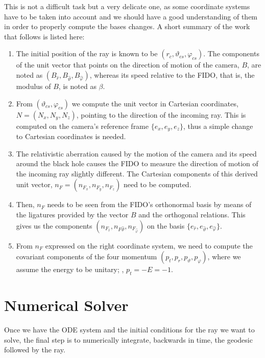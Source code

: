 This is not a difficult task but a very delicate one, as some coordinate systems have to be taken into account and we should have a good understanding of them in order to properly compute the bases changes. A short summary of the work that follows is listed here:
\begin{enumerate}
	\item The initial position of the ray is known to be $(r_c, \vartheta_{cs}, \varphi_{cs})$. The components of the unit vector that points on the direction of motion of the camera, $B$, are noted as $(B_{\widehat{r}}, B_{\widehat{\vartheta}}, B_{\widehat{\varphi}})$, whereas its speed relative to the \ac{FIDO}, that is, the modulus of $B$, is noted as $\beta$.
	\item From $(\vartheta_{cs}, \varphi_{cs})$ we compute the unit vector in Cartesian coordinates, $N = (N_x, N_y, N_z)$, pointing to the direction of the incoming ray. This is computed on the camera's reference frame $\{e_x, e_y, e_z\}$, thus a simple change to Cartesian coordinates is needed.
	\item The relativistic aberration caused by the motion of the camera and its speed around the black hole causes the \ac{FIDO} to measure the direction of motion of the incoming ray slightly different. The Cartesian components of this derived unit vector, $n_F = (n_{F_x}, n_{F_y}, n_{F_z})$ need to be computed.
	\item Then, $n_F$ needs to be seen from the \ac{FIDO}'s orthonormal basis by means of the ligatures provided by the vector $B$ and the orthogonal relations. This gives us the components $(n_{F_{\widehat{r}}}, n_{F{\widehat{\vartheta}}}, n_{F_{\widehat{\varphi}}})$ on the basis $\{e_{\widehat{r}}, e_{\widehat{\vartheta}}, e_{\widehat{\varphi}}\}$.
	\item From $n_F$ expressed on the right coordinate system, we need to compute the covariant components of the four momentum $(p_t, p_r, p_\vartheta, p_\varphi)$, where we assume the energy to be unitary; \ie, $p_t = -E = -1$.
\end{enumerate}


\section{Numerical Solver}

Once we have the \ac{ODE} system and the initial conditions for the ray we want to solve, the final step is to numerically integrate, backwards in time, the geodesic followed by the ray.

